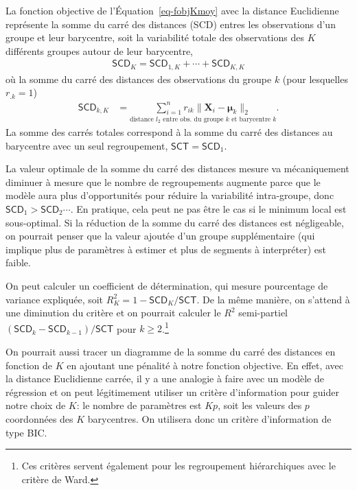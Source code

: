 \documentclass[
  11pt,
  letterpaper,
]{book}
\theoremstyle{definition}
\theoremstyle{remark}
\begin{document}
La fonction objective de l'Équation~\ref{eq-fobjKmoy} avec la distance
Euclidienne représente la somme du carré des distances (SCD) entres les
observations d'un groupe et leur barycentre, soit la variabilité totale
des observations des \(K\) différents groupes autour de leur barycentre,
\begin{align*}
\mathsf{SCD}_K = \mathsf{SCD}_{1,K} + \cdots + \mathsf{SCD}_{K,K}
\end{align*} où la somme du carré des distances des observations du
groupe \(k\) (pour lesquelles \(r_{.k}=1\)) \begin{align*}
\mathsf{SCD}_{k,K} &= \underset{\mbox{distance $l_2$ entre obs. du groupe $k$ et barycentre $k$}}{\sum_{i=1}^n r_{ik}\|\mathbf{X}_i -  \boldsymbol{\mu}_{k}\|_2}.
\end{align*} La somme des carrés totales correspond à la somme du carré
des distances au barycentre avec un seul regroupement,
\(\mathsf{SCT} = \mathsf{SCD}_{1}\).

La valeur optimale de la somme du carré des distances mesure va
mécaniquement diminuer à mesure que le nombre de regroupements augmente
parce que le modèle aura plus d'opportunités pour réduire la variabilité
intra-groupe, donc \(\mathsf{SCD}_1 > \mathsf{SCD}_2 \cdots\). En
pratique, cela peut ne pas être le cas si le minimum local est
sous-optimal. Si la réduction de la somme du carré des distances est
négligeable, on pourrait penser que la valeur ajoutée d'un groupe
supplémentaire (qui implique plus de paramètres à estimer et plus de
segments à interpréter) est faible.

On peut calculer un coefficient de détermination, qui mesure pourcentage
de variance expliquée, soit \(R^2_K = 1-\mathsf{SCD}_K/\mathsf{SCT}\).
De la même manière, on s'attend à une diminution du critère et on
pourrait calculer le \(R^2\) semi-partiel
\((\mathsf{SCD}_{k} - \mathsf{SCD}_{k-1})/\mathsf{SCT}\) pour
\(k \geq 2\).\footnote{Ces critères servent également pour les
  regroupement hiérarchiques avec le critère de Ward.}

On pourrait aussi tracer un diagramme de la somme du carré des distances
en fonction de \(K\) en ajoutant une pénalité à notre fonction
objective. En effet, avec la distance Euclidienne carrée, il y a une
analogie à faire avec un modèle de régression et on peut légitimement
utiliser un critère d'information pour guider notre choix de \(K\): le
nombre de paramètres est \(Kp\), soit les valeurs des \(p\) coordonnées
des \(K\) barycentres. On utilisera donc un critère d'information de
type BIC.
\end{document}
